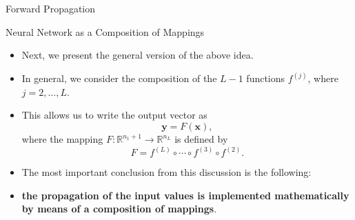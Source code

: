 \documentclass[8pt,american]{beamer}
\begin{document}
\begin{frame}{Forward Propagation}

\begin{block}{Neural Network as a Composition of Mappings}
\begin{itemize}
\justifying
\item Next, we present the general version of the above idea.
\item In general, we consider the composition of the $L-1$ functions
  $f^{\left(j\right)}$, where $j=2,\ldots,L$.
\item This allows us to write the output vector as
  \begin{equation}
  \mathbf{y}=F\left(\mathbf{x}\right),
  \end{equation}
  where the mapping $F:\mathbb{R}^{n_{1}+1}\rightarrow\mathbb{R}^{n_{L}}$ is
  defined by
  \begin{equation}
  F=f^{\left(L\right)}\circ\cdots\circ f^{\left(3\right)}\circ f^{\left(2\right)}.
  \end{equation}
\item The most important conclusion from this discussion is the following:
\item \textbf{the propagation of the input values is implemented mathematically
  by means of a composition of mappings}.
\end{itemize}
\end{block}

\end{frame}
\end{document}
